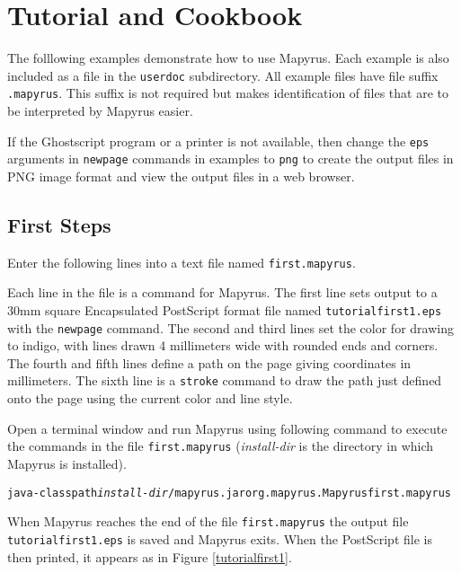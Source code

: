 
\section{Tutorial and Cookbook}

The folllowing examples demonstrate how to use Mapyrus.  Each example is also
included as a file in the \texttt{userdoc} subdirectory.  All example files
have file suffix \texttt{.mapyrus}.  This suffix is not required but makes
identification of files that are to be interpreted by Mapyrus easier.

If the Ghostscript program or a printer is not available, then change the
\texttt{eps} arguments in \texttt{newpage} commands in examples to \texttt{png}
to create the output files in PNG image format and view the output files in a
web browser.

\subsection{First Steps}

Enter the following lines into a text file named \texttt{first.mapyrus}.



Each line in the file is a command for Mapyrus.  The first line sets output to
a 30mm square Encapsulated PostScript format file named
\texttt{tutorialfirst1.eps} with the \texttt{newpage} command.  The second and
third lines set the color for drawing to indigo, with lines drawn 4 millimeters
wide with rounded ends and corners.  The fourth and fifth lines define a path
on the page giving coordinates in millimeters.  The sixth line is a
\texttt{stroke} command to draw the path just defined onto the page using the
current color and line style.

Open a terminal window and run Mapyrus using following command to execute the
commands in the file \texttt{first.mapyrus}
(\textit{install-dir} is the directory
in which Mapyrus is installed).

\begin{alltt}
java -classpath \textit{install-dir}/mapyrus.jar org.mapyrus.Mapyrus first.mapyrus
\end{alltt}

When Mapyrus reaches the end of the file \texttt{first.mapyrus}
the output file \texttt{tutorialfirst1.eps} is saved and Mapyrus exits.
When the PostScript file is then printed, it appears as in
Figure \ref{tutorialfirst1}.

